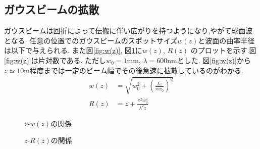 \subsection{ガウスビームの拡散}
ガウスビームは回折によって伝搬に伴い広がりを持つようになり,やがて球面波となる.
任意の位置でのガウスビームのスポットサイズ$w(z)$と波面の曲率半径は以下で与えられる.
また図\ref{fig:w(z)}, 図\ref{fig:R(z)}に$w(z)$, $R(z)$
のプロットを示す.図\ref{fig:w(z)}は片対数である.
ただし$w_0=1\si{\milli\metre}$, $\lambda=600\si{\nano\metre}$とした.
図\ref{fig:w(z)}から$z\simeq10\si{\metre}$程度までは一定のビーム幅でその後急速に拡散しているのがわかる.
\begin{align}
  w(z)&=\sqrt{w_0^2+\left(\frac{\lambda z}{\pi w_0}\right)^2}\\
  R(z)&=z+\frac{\pi^2w_0^4}{\lambda^2z}
\end{align}
\clearpage
\begin{figure}[hptb]
\begin{center}

\caption{$z$-$w(z)$の関係}
\label{fig:w(z)}

\caption{$z$-$R(z)$の関係}
\label{fig:R(z)}
\end{center}
\end{figure}